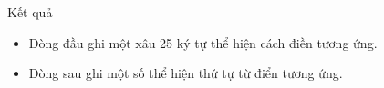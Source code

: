 Kết quả
 
\begin{itemize}
	\item Dòng đầu ghi một xâu 25 ký tự thể hiện cách điền tương ứng.
	\item Dòng sau ghi một số thể hiện thứ tự từ điển tương ứng.
\end{itemize}